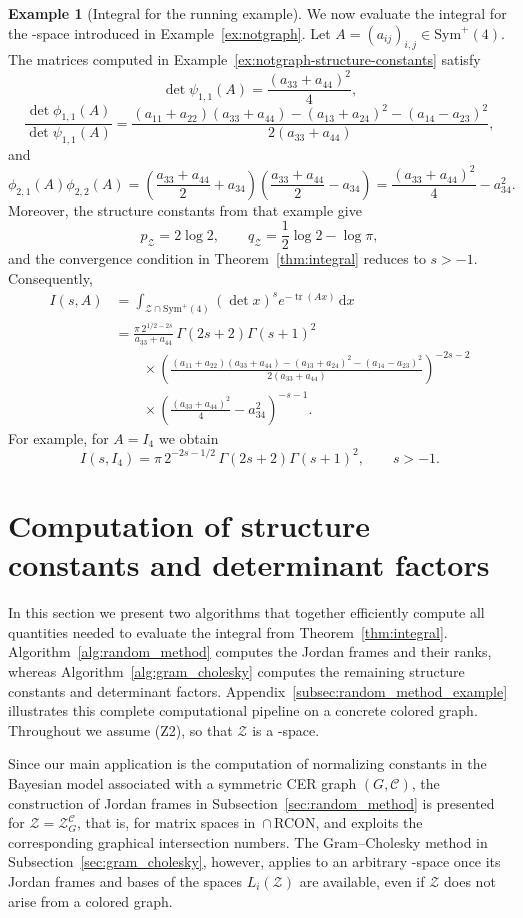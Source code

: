 \documentclass[12pt]{amsart}
\theoremstyle{plain}
\theoremstyle{definition}
\newtheorem{example}[theorem]{Example}
\theoremstyle{remark}
\newcommand{\1}{\mathbf{1}}
\newcommand{\dd}{\mathrm{d}}
\newcommand{\tr}{\operatorname{tr}}
\begin{document}
\begin{example}[Integral for the running example]\label{ex:notgraph-integral}
We now evaluate the integral for the \cBC-space introduced in
Example~\ref{ex:notgraph}. Let $A=(a_{ij})_{i,j}\in\mathrm{Sym}^+(4)$.
The matrices computed in Example~\ref{ex:notgraph-structure-constants}
satisfy
\[
\det\psi_{1,1}(A)=\frac{(a_{33}+a_{44})^2}{4},
\]
\[
\frac{\det\phi_{1,1}(A)}{\det\psi_{1,1}(A)}
=\frac{
(a_{11}+a_{22})(a_{33}+a_{44})
-(a_{13}+a_{24})^2-(a_{14}-a_{23})^2
}{2(a_{33}+a_{44})},
\]
and
\[
\phi_{2,1}(A)\phi_{2,2}(A)
=\left(\frac{a_{33}+a_{44}}{2}+a_{34}\right)
 \left(\frac{a_{33}+a_{44}}{2}-a_{34}\right)
=\frac{(a_{33}+a_{44})^2}{4}-a_{34}^2.
\]
Moreover, the structure constants from that example give
\[
p_{\mathcal Z}=2\log 2,
\qquad
q_{\mathcal Z}=\frac12\log 2-\log\pi,
\]
and the convergence condition in Theorem~\ref{thm:integral} reduces to
$s>-1$. Consequently,
\[
\begin{aligned}
I(s,A)
&=\int_{\mathcal Z\cap\mathrm{Sym}^+(4)}
(\det x)^s e^{-\tr(Ax)}\,\dd x\\
&=\frac{\pi\,2^{1/2-2s}}{a_{33}+a_{44}}\,
\Gamma(2s+2)\Gamma(s+1)^2\\
&\qquad\times
\left(
\frac{
(a_{11}+a_{22})(a_{33}+a_{44})
-(a_{13}+a_{24})^2-(a_{14}-a_{23})^2
}{2(a_{33}+a_{44})}
\right)^{-2s-2}\\
&\qquad\times
\left(\frac{(a_{33}+a_{44})^2}{4}-a_{34}^2\right)^{-s-1}.
\end{aligned}
\]
For example, for $A=I_4$ we obtain
\[
I(s,I_4)
=\pi\,2^{-2s-1/2}\,
\Gamma(2s+2)\Gamma(s+1)^2,
\qquad s>-1.
\]
\end{example}


\section{Computation of structure constants and determinant factors}\label{sec:computation}

In this section we present two algorithms that together efficiently compute all
quantities needed to evaluate the integral from
Theorem~\ref{thm:integral}. Algorithm~\ref{alg:random_method} computes
the Jordan frames and their ranks, whereas
Algorithm~\ref{alg:gram_cholesky} computes the remaining structure
constants and determinant factors. Appendix~\ref{subsec:random_method_example}
illustrates this complete computational pipeline on a concrete colored graph.
Throughout we assume (Z2), so that $\mathcal Z$ is a \cBC-space.

Since our main application is the computation of normalizing constants
in the Bayesian model associated with a symmetric CER graph
$(G,\mathcal C)$, the construction of Jordan frames in
Subsection~\ref{sec:random_method} is presented for
$\mathcal Z=\mathcal Z_G^{\mathcal C}$, that is, for matrix spaces in
\cBC\,$\cap$\,RCON, and exploits the corresponding graphical
intersection numbers. The Gram--Cholesky method in
Subsection~\ref{sec:gram_cholesky}, however, applies to an arbitrary
\cBC-space once its Jordan frames and bases of the spaces
$L_i(\mathcal Z)$ are available, even if $\mathcal Z$ does not arise
from a colored graph.
\end{document}
